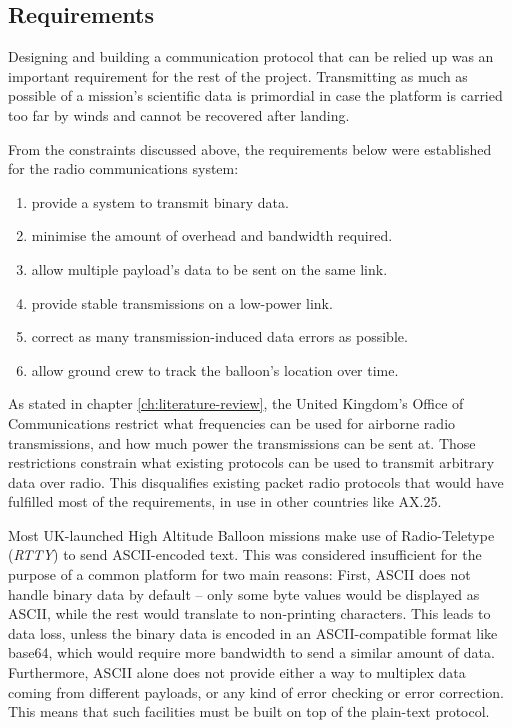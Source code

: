 \subsection{Requirements}
\label{ssec:requirements}

Designing and building a communication protocol that can be relied up was an
important requirement for the rest of the project. Transmitting as much as
possible of a mission's scientific data is primordial in case the platform
is carried too far by winds and cannot be recovered after landing.

From the constraints discussed above, the requirements below were established
for the radio communications system:

\begin{enumerate}
\item provide a system to transmit binary data.%
\item minimise the amount of overhead and bandwidth required.%
\item allow multiple payload's data to be sent on the same link.%
\item provide stable transmissions on a low-power link.%
\item correct as many transmission-induced data errors as possible.%
\item allow ground crew to track the balloon's location over time.%
\end{enumerate}

As stated in chapter \ref{ch:literature-review}, the United Kingdom's Office
of Communications restrict what frequencies can be used for airborne
radio transmissions, and how much power the transmissions can be sent at.
Those restrictions constrain what existing protocols can be used to transmit
arbitrary data over radio. This disqualifies existing packet radio protocols
that would have fulfilled most of the requirements, in use in other countries
like AX.25.

Most UK-launched High Altitude Balloon missions make use of Radio-Teletype
(\textit{RTTY}) to send ASCII-encoded text. This was considered insufficient
for the purpose of a common platform for two main reasons: First, ASCII does
not handle binary data by default -- only some byte values would be displayed
as ASCII, while the rest would translate to non-printing characters. This leads
to data loss, unless the binary data is encoded in an ASCII-compatible format
like base64, which would require more bandwidth to send a similar amount of
data. Furthermore, ASCII alone does not provide either a way to multiplex data
coming from different payloads, or any kind of error checking or error
correction. This means that such facilities must be built on top of the
plain-text protocol.

